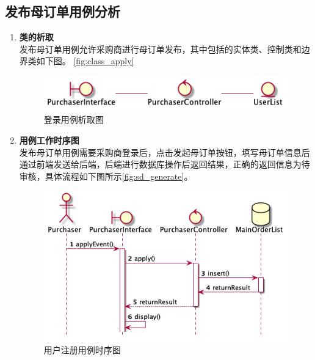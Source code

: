 
	\subsection{发布母订单用例分析} %
	\label{sub:发布母订单用例分析}
	\begin{enumerate}
		\item \textbf{类的析取} \\
		发布母订单用例允许采购商进行母订单发布，其中包括的实体类、控制类和边界类如下图。
		\autoref{fig:class_apply}
		\begin{figure}[htp]
		    \centering
		    \includegraphics[width=12cm]{misc/figure_src/class_diagram/apply.png}
		    \caption{登录用例析取图}
		    \label{fig:class_apply}
		\end{figure}

		\item \textbf{用例工作时序图} \\ 
		发布母订单用例需要采购商登录后，点击发起母订单按钮，填写母订单信息后通过前端发送给后端，后端进行数据库操作后返回结果，正确的返回信息为待审核，具体流程如下图所示\autoref{fig:sd_generate}。

		\begin{figure}[htp]
		    \centering
		    \includegraphics[width=12cm]{misc/figure_src/sequence_diagram/sd_applyMainOrder.png}
		    \caption{用户注册用例时序图}
		    \label{fig:sd_generate}
		\end{figure}

	\end{enumerate}

